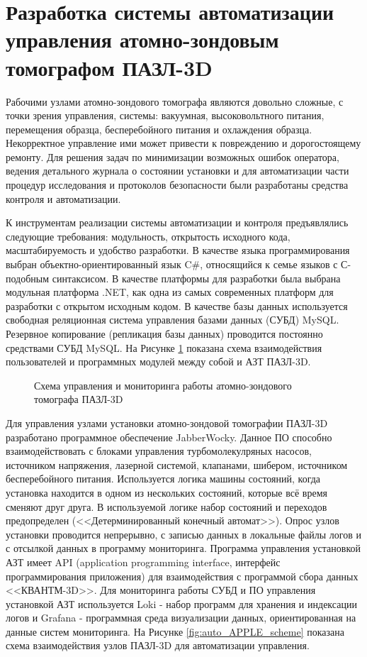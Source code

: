 \FloatBarrier
\section{Разработка системы автоматизации управления атомно-зондовым томографом ПАЗЛ-3D}\label{sec:ch2/sec6}

Рабочими узлами атомно-зондового томографа являются довольно сложные, с точки зрения управления, системы: вакуумная, высоковольтного питания, перемещения образца, бесперебойного питания и охлаждения образца. Некорректное управление ими может привести к повреждению и дорогостоящему ремонту. Для решения задач по минимизации возможных ошибок оператора, ведения детального журнала о состоянии установки и для автоматизации части процедур исследования и протоколов безопасности были разработаны средства контроля и автоматизации. 

К инструментам реализации системы автоматизации и контроля предъявлялись следующие требования: модульность, открытость исходного кода, масштабируемость и удобство разработки. В качестве языка программирования выбран объектно-ориентированный язык C$\#$, относящийся к семье языков с С-подобным синтаксисом. В качестве платформы для разработки была выбрана модульная платформа .NET, как одна из самых современных платформ для разработки с открытом исходным кодом. В качестве базы данных используется свободная реляционная система управления базами данных (СУБД) MySQL. Резервное копирование (репликация базы данных) проводится постоянно средствами СУБД MySQL. На Рисунке \cref{fig:auto_APPLE_manage}  показана схема взаимодействия пользователей и программных модулей между собой и АЗТ ПАЗЛ-3D.

\begin{figure}[htb]
	\caption{Схема управления и мониторинга работы атомно-зондового томографа ПАЗЛ-3D}
	\label{fig:auto_APPLE_manage}
\end{figure}

Для управления узлами установки атомно-зондовой томографии ПАЗЛ-3D разработано программное обеспечение JabberWocky. Данное ПО способно взаимодействовать с блоками управления турбомолекулряных насосов, источником напряжения, лазерной системой, клапанами, шибером, источником бесперебойного питания. Используется логика машины состояний, когда установка находится в одном из нескольких состояний, которые всё время сменяют друг друга. В используемой логике набор состояний и переходов предопределен (<<Детерминированный конечный автомат>>). Опрос узлов установки проводится непрерывно, с записью данных в локальные файлы логов и с отсылкой данных в программу мониторинга. Программа управления установкой АЗТ имеет API (application programming interface, интерфейс программирования приложения) для взаимодействия с программой сбора данных <<КВАНТМ-3D>>. Для мониторинга работы СУБД и ПО управления установкой АЗТ используется Loki - набор программ для хранения и индексации логов и Grafana - программная среда визуализации данных, ориентированная на данные систем мониторинга. На Рисунке \cref{fig:auto_APPLE_scheme} показана схема взаимодействия узлов ПАЗЛ-3D для автоматизации управления.

